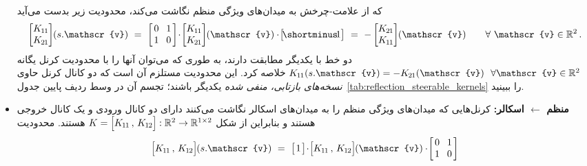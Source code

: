 \begin{itemize}
	که از علامت-چرخش به میدان‌های ویژگی منظم نگاشت می‌کند، محدودیت زیر بدست می‌آید
	\begin{align}
		\begin{bmatrix} \Koo \\ \Kto \end{bmatrix} \mkern-4mu (s.\mathscr{v})
		\ =\ 
		\begin{bmatrix} \hspace{1.5pt} 0 &\mkern-4mu 1 \hspace*{1.5pt} \\ \hspace{1.5pt} 1 &\mkern-4mu 0 \hspace*{1.5pt} \end{bmatrix}
		\!\cdot\!
		\begin{bmatrix} \Koo \\ \Kto \end{bmatrix} \mkern-4mu (\mathscr{v})
		\cdot\!
		\big[\! \shortminus\!1 \big]
		\ =\ 
		- \begin{bmatrix} \Kto \\ \Koo \end{bmatrix} \mkern-4mu (\mathscr{v})
		\qquad \forall\ \mathscr{v} \in \R^2 \,.
	\end{align}
	دو خط با یکدیگر مطابقت دارند، به طوری که می‌توان آنها را با محدودیت کرنل یگانه
	${\Koo(s.\mathscr{v}) = -\Kto(\mathscr{v})}\ \ \forall \mathscr{v}\in \R^2$ خلاصه کرد.
	این محدودیت مستلزم آن است که دو کانال کرنل حاوی \emph{نسخه‌های بازتابی، منفی شده} یکدیگر باشند؛ تجسم آن در وسط ردیف پایین جدول~\ref{tab:reflection_steerable_kernels} را ببینید.
	\item[{\rule[2.0pt]{2pt}{2pt}}]
	\textbf{منظم $\leftarrow$ اسکالر:}
	کرنل‌هایی که میدان‌های ویژگی منظم را به میدان‌های اسکالر نگاشت می‌کنند دارای دو کانال ورودی و یک کانال خروجی هستند و بنابراین از شکل
	$K = \pig[\Koo \,,\, \Kot\pig]: \R^2 \to \R^{1\times2}$ هستند.
	محدودیت
	\begin{align}
		\pig[\Koo \,,\, \Kot\pig] \mkern-1mu (s.\mathscr{v})
		\ =\ 
		\big[\mkern2mu 1 \mkern2mu\big]
		\!\cdot\!
		\pig[\Koo \,,\, \Kot\pig] \mkern-1mu (\mathscr{v})
		\cdot\!
		\begin{bmatrix} \hspace{1.5pt} 0 &\mkern-4mu 1 \hspace*{1.5pt} \\ \hspace{1.5pt} 1 &\mkern-4mu 0 \hspace*{1.5pt} \end{bmatrix}

\end{align}
\end{itemize}
